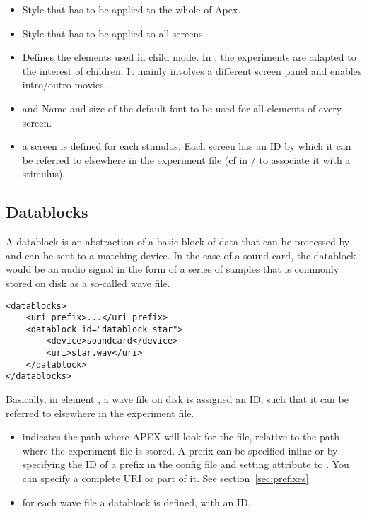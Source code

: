 \begin{itemize}
\item {} Style that has to be applied to the whole of Apex.

\item {} Style that has to be applied to all screens.

\item {} Defines the elements used in child mode. In , the experiments are adapted to the interest of children. It mainly involves a different screen panel and enables intro/outro movies. 

\item {} and  Name and size of the default font to be used for all elements of every screen. 

\item {} a screen is defined for each stimulus. Each
screen has an ID by which it can be referred to elsewhere in the
experiment file (cf in / to associate it with a stimulus).

\end{itemize}


\subsection{Datablocks}
\label{sec:datablocks}


A datablock is an abstraction of a basic block of data that can be
processed by \apex and can be sent to a matching device. In the
case of a sound card, the datablock would be an audio signal in
the form of a series of samples that is commonly stored on disk as
a so-called wave file.

\begin{lstlisting}
<datablocks>
    <uri_prefix>...</uri_prefix>
    <datablock id="datablock_star">
        <device>soundcard</device>
        <uri>star.wav</uri>
    </datablock>
</datablocks>
\end{lstlisting}

Basically, in element , a wave file on disk is
assigned an ID, such that it can be referred to elsewhere in the
experiment file.

\begin{itemize}
\item {} indicates the path where APEX will look for the file, relative to the path where the experiment file is stored. A prefix can be specified inline or by
specifying the ID of a prefix in the \apex config file and setting
attribute  to . You can specify
a complete URI or part of it. See section~\ref{sec:prefixes}

\item {} for each wave file a datablock is
defined, with an ID.
\end{itemize}

